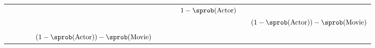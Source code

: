 \begin{table}[]
\begin{tabular}{lllllllllll}
                          &                           &                   &                                                               &                                                                                                                 &                           &                                                             &                                                                            & \cellcolor[HTML]{FC8D59}$1 - \sprob(\text{Actor})$                                       &                                        &                                                                                                                 \\
                          &                           &                   &                                                               &                                                                                                                 &                           &                                                             &                                                                            &                                                                                          &                                        & \cellcolor[HTML]{FC8D59}$(1 - \sprob(\text{Actor})) - \sprob(\text{Movie})$                                     \\
                          &                           &                   & \cellcolor[HTML]{FC8D59}{}    &                                                                                                                 &                           &                                                             &                                                                            &                                                                                          &                                        &                                                                                                                 \\
                          &                           &                   &                                                               & \cellcolor[HTML]{FC8D59}$(1 - \sprob(\text{Actor})) - \sprob(\text{Movie})$                                     &                           &                                                             &                                                                            &                                                                                          &                                        &                                                                                                                 \\

\end{tabular}
\end{table}
